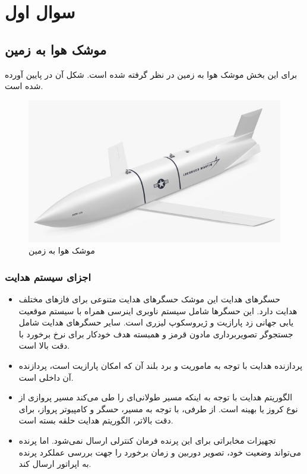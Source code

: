 \section{سوال اول}
\subsection{موشک هوا به زمین}
برای این بخش موشک هوا به زمین
در نظر گرفته شده است. شکل آن در پایین آورده شده است.
 \begin{figure}[H]
	\centering
	\includegraphics[width=\linewidth]{../Figure/Q1/agm_158.jpg}
	\caption{موشک هوا به زمین
}
\end{figure}
\subsubsection{اجزای سیستم هدایت}
\begin{itemize}
	\item حسگرهای هدایت
	این موشک حسگرهای هدایت متنوعی برای فازهای مختلف هدایت دارد. این حسگرها شامل سیستم ناوبری اینرسی
	 همراه با سیستم موقعیت یابی جهانی زد پارازیت
	 و ژیروسکوپ لیزری
	 است. سایر حسگرهای هدایت شامل جستجوگر تصویربرداری مادون قرمز
	و همبسته هدف خودکار
	برای نرخ برخورد با دقت بالا است.
	\item پردازنده هدایت
	با توجه به ماموریت و برد بلند آن که امکان پارازیت است، پردازنده آن داخلی است.
	\item الگوریتم هدایت
	با توجه به اینکه مسیر طولانی‌ای را طی می‌کند مسیر پروازی از نوع کروز یا بهینه است. از طرفی، با توجه به مسیر، حسگر و کامپیوتر پرواز، برای دقت بالاتر، الگوریتم هدایت حلقه بسته است.
	\item تجهیزات مخابراتی
	برای این پرنده فرمان کنترلی ارسال نمی‌شود. اما پرنده می‌تواند وضعیت خود، تصویر دوربین و زمان برخورد را جهت بررسی عملکرد پرنده به اپراتور ارسال کند.
\end{itemize}
